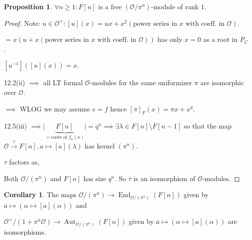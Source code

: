 \documentclass[openany]{amsbook}
\numberwithin{section}{chapter}
\theoremstyle{definition}
\newtheorem{proposition}[theorem]{Proposition}
\newtheorem{corollary}[theorem]{Corollary}
\begin{document}
\begin{proposition}
    \(\forall n \geq 1: F[n]\) is a free \((\mathcal{O} / \pi^n )\)-module of rank \(1\).
\end{proposition}

\begin{proof}
    Note: \(u\in \mathcal{O}^\times: [u](x) = ux + x^2(\text{power series in } x \text{ with coeff. in } \mathcal{O})\).
    
    \(=x(u + x(\text{power series in } x \text{ with coeff. in } \mathcal{O}))\) has only \(x=0\) as a root in \(P_C\).  

    \([u ^{-1}]([u](x)) = x\).
    
    12.2(ii) \(\implies\) all LT formal \(\mathcal{O}\)-modules for the same uniformizer \(\pi\) are isomorphic over \(\mathcal{O}\).
    
    \(\implies\) WLOG we may assume \(e = f\) hence \([\pi]_F (x) = \pi x + x^q\).

    12.5(iii) \(\implies \vert \underbrace{F[n]}_{=\text{roots of } f_n(x)} \vert = q^n \implies \exists \lambda \in F[n] \setminus F[n-1]\) so that the map \(\mathcal{O} \overset{\tau}{\to} F[n], a \mapsto [a](\lambda)\) has kernel \((\pi^n)\).

    \(\tau\) factors as,

    \begin{center}
    \end{center}

    Both \(\mathcal{O} / (\pi^n)\) and \(F[n]\) has size \(q^n\). So \(\overline{\tau}\) is an isomorphism of \(\mathcal{O}\)-modules.

\end{proof}

\begin{corollary}
    The maps \(\mathcal{O} / (\pi ^ n) \to \operatorname{End}_{\mathcal{O} / (\pi^n)} (F[n])\) given by \(\overline{a} \mapsto (\alpha \mapsto [a](\alpha))\) and

    \(\mathcal{O}^\times / (1 + \pi^n \mathcal{O}) \to \operatorname{Aut}_{\mathcal{O}/(\pi^n)}(F[n])\) given by \(\overline{a} \mapsto (\alpha \mapsto [a](\alpha))\) are isomorphisms.
\end{corollary}
\end{document}
